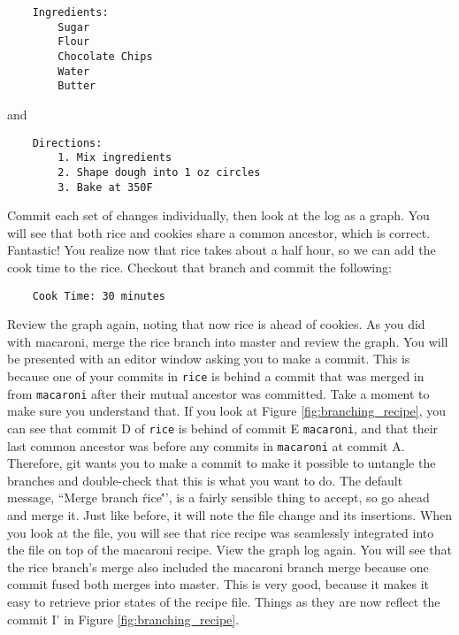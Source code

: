 \begin{verbatim}
    Ingredients:
        Sugar
        Flour
        Chocolate Chips
        Water
        Butter
\end{verbatim}

and

\begin{verbatim}
    Directions:
        1. Mix ingredients
        2. Shape dough into 1 oz circles
        3. Bake at 350F
\end{verbatim}

\par{
Commit each set of changes individually, then look at the log as a graph. You
will see that both rice and cookies share a common ancestor, which is correct.
Fantastic! You realize now that rice takes about a half hour, so we can add
the cook time to the rice. Checkout that branch and commit the following:
}

\begin{verbatim}
    Cook Time: 30 minutes
\end{verbatim}

\par{
Review the graph again, noting that now rice is ahead of cookies. As you did
with macaroni, merge the rice branch into master and review the graph. You
will be presented with an editor window asking you to make a commit. This is
because one of your commits in \verb+rice+ is behind a commit that was merged
in from \verb+macaroni+ after their mutual ancestor was committed. Take a
moment to make sure you understand that. If you look at
Figure \ref{fig:branching_recipe}, you can see that commit D of \verb+rice+ is
behind of commit E \verb+macaroni+, and that their last common ancestor was
before any commits in \verb+macaroni+ at commit A. Therefore, git wants you to
make a commit to make it possible to untangle the branches and double-check
that this is what you want to do. The default message, ``Merge branch
\'rice\''', is a fairly sensible thing to accept, so go ahead and merge it.
Just like before, it will note the file change and its insertions. When you
look at the file, you will see that rice recipe was seamlessly integrated into
the file on top of the macaroni recipe. View the graph log again. You will see
that the rice branch's merge also included the macaroni branch merge because
one commit fused both merges into master. This is very good, because it makes
it easy to retrieve prior states of the recipe file. Things as they are now
reflect the commit I' in Figure \ref{fig:branching_recipe}.
}

